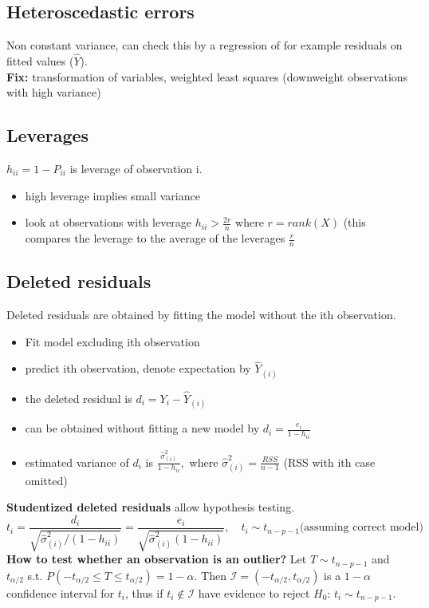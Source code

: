 \documentclass{article}
\begin{document}
\subsection{Heteroscedastic errors}
Non constant variance, can check this by a regression of for example residuals on fitted values ($\hat{Y}$).\\
\textbf{Fix:} transformation of variables, weighted least squares (downweight observations with high variance)

\subsection{Leverages}
$h_{ii} = 1-P_{ii}$ is leverage of observation i.
\begin{itemize}
    \item high leverage implies small variance
    \item look at observations with leverage $h_{ii} > \frac{2r}{n}$ where $r = rank(X)$ (this compares the leverage to the average of the leverages $\frac{r}{n}$
\end{itemize}

\subsection{Deleted residuals}
Deleted residuals are obtained by fitting the model without the ith observation.
\begin{itemize}
    \item Fit model excluding ith observation
    \item predict ith observation, denote expectation by $\hat{Y}_{(i)}$
    \item the deleted residual is $d_i = Y_i - \hat{Y}_{(i)}$
    \item can be obtained without fitting a new model by $d_i = \frac{e_i}{1-h_{ii}}$
    \item estimated variance of $d_i$ is $\frac{\hat{\sigma}_{(i)}^2}{1-h_{ii}},$ where $\hat{\sigma}_{(i)}^2 = \frac{RSS}{n-1}$ (RSS with ith case omitted)
\end{itemize}
\textbf{Studentized deleted residuals} allow hypothesis testing. $$t_i = \frac{d_i}{\sqrt{\hat{\sigma}_{(i)}^2/(1-h_{ii})}} = \frac{e_i}{\sqrt{\hat{\sigma}_{(i)}^2(1-h_{ii})}}, \quad t_i \sim t_{n-p-1} \text{(assuming correct model)}$$
\textbf{How to test whether an observation is an outlier?}
Let $T\sim t_{n-p-1}$ and $t_{\alpha/2}$ s.t. $P(-t_{\alpha/2} \leq T \leq t_{\alpha/2}) = 1- \alpha$. Then $\mathcal{I} = (-t_{\alpha/2}, t_{\alpha/2})$ is a $ 1- \alpha$ confidence interval for $t_i$, thus if $t_i \notin \mathcal{I}$ have evidence to reject $H_0$: $t_i \sim t_{n-p-1}$.
\end{document}
